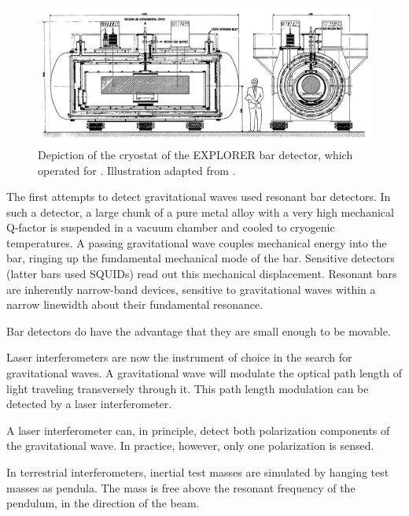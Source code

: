 \begin{figure}
\includegraphics[width=\columnwidth]{chapter1/figures/explorer.png}
\caption{\label{fig:explorer-bar}Depiction of the cryostat of the EXPLORER bar detector, which operated  for .  Illustration adapted from .}
\end{figure}

The first attempts to detect gravitational waves used resonant bar
detectors.  In such a detector, a large chunk of a pure metal alloy
with a very high mechanical Q-factor is suspended in a vacuum chamber
and cooled to cryogenic temperatures.  A passing gravitational wave
couples mechanical energy into the bar, ringing up the fundamental
mechanical mode of the bar.  Sensitive detectors (latter bars used
SQUIDs) read out this mechanical displacement.  Resonant bars are
inherently narrow-band devices, sensitive to gravitational waves
within a narrow linewidth about their fundamental resonance.

Bar detectors do have the advantage that they are small enough to be
movable.

\cite{Weiss1972Electromagnetically,Forward1978Wideband}

Laser interferometers are now the instrument of choice in
the search for gravitational waves.  A gravitational wave will
modulate the optical path length of light traveling transversely
through it.  This path length modulation can be detected by a laser
interferometer.

A laser interferometer can, in principle, detect both polarization
components of the gravitational wave.  In practice, however, only one
polarization is sensed.

In terrestrial interferometers, inertial test masses are simulated by
hanging test masses as pendula.  The mass is free above the resonant
frequency of the pendulum, in the direction of the beam.

